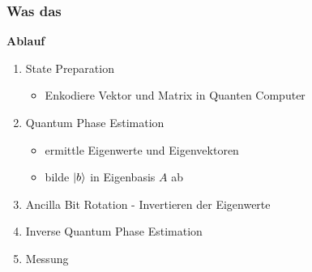     \begin{frame}
    \frametitle{Was das}

        \textbf{Ablauf}
        \begin{enumerate}
            \item State Preparation
            \begin{itemize}
                \item Enkodiere Vektor und Matrix in Quanten Computer
            \end{itemize}
            \item Quantum Phase Estimation
            \begin{itemize}
                \item ermittle Eigenwerte und Eigenvektoren 
                \item bilde $\ket{b}$ in Eigenbasis $A$ ab
            \end{itemize}
 
            \item Ancilla Bit Rotation - Invertieren der Eigenwerte
            \item Inverse Quantum Phase Estimation
            \item Messung

        \end{enumerate}
 
    

    \end{frame}

